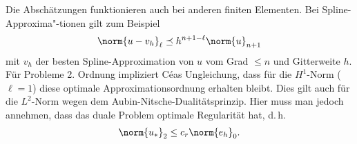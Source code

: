 Die Abschätzungen funktionieren auch bei anderen finiten Elementen.
Bei Spline-Approxima"-tionen gilt zum Beispiel
\begin{align*}
    \norm{u - v_h}_\ell \preceq h^{n+1-\ell} \norm{u}_{n+1}
\end{align*}
mit $v_h$ der besten Spline-Approximation von $u$ vom Grad $\le n$ und Gitterweite $h$.
Für Probleme 2. Ordnung impliziert Céas Ungleichung, dass für
die $H^1$-Norm ($\ell = 1$) diese optimale Approximationsordnung erhalten bleibt.
Dies gilt auch für die $L^2$-Norm wegen dem Aubin-Nitsche-Dualitätsprinzip.
Hier muss man jedoch annehmen, dass das duale Problem optimale Regularität hat, d.\,h.
\begin{align*}
    \norm{u_\ast}_2 \le c_r \norm{e_h}_0.
\end{align*}

\pagebreak
